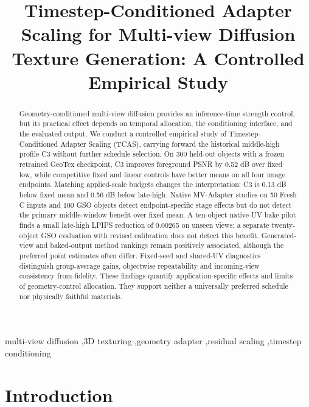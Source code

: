 \documentclass[times,twocolumn,final]{elsarticle}
\begin{document}
\begin{frontmatter}

\title{Timestep-Conditioned Adapter Scaling for Multi-view Diffusion Texture Generation: A Controlled Empirical Study}


\begin{abstract}
Geometry-conditioned multi-view diffusion provides an inference-time strength control, but its practical effect depends on temporal allocation, the conditioning interface, and the evaluated output. We conduct a controlled empirical study of Timestep-Conditioned Adapter Scaling (TCAS), carrying forward the historical middle-high profile C3 without further schedule selection. On 300 held-out objects with a frozen retrained GeoTex checkpoint, C3 improves foreground PSNR by 0.52 dB over fixed low, while competitive fixed and linear controls have better means on all four image endpoints. Matching applied-scale budgets changes the interpretation: C3 is 0.13 dB below fixed mean and 0.56 dB below late-high. Native MV-Adapter studies on 50 Fresh C inputs and 100 GSO objects detect endpoint-specific stage effects but do not detect the primary middle-window benefit over fixed mean. A ten-object native-UV bake pilot finds a small late-high LPIPS reduction of 0.00265 on unseen views; a separate twenty-object GSO evaluation with revised calibration does not detect this benefit. Generated-view and baked-output method rankings remain positively associated, although the preferred point estimates often differ. Fixed-seed and shared-UV diagnostics distinguish group-average gains, objectwise repeatability and incoming-view consistency from fidelity. These findings quantify application-specific effects and limits of geometry-control allocation. They support neither a universally preferred schedule nor physically faithful materials.
\end{abstract}

\begin{keyword}
\KWD
multi-view diffusion \sep 3D texturing \sep geometry adapter \sep residual scaling \sep timestep conditioning
\end{keyword}

\end{frontmatter}

\raggedbottom
\linenumbers

\section{Introduction}
\label{sec:intro}
\end{document}
